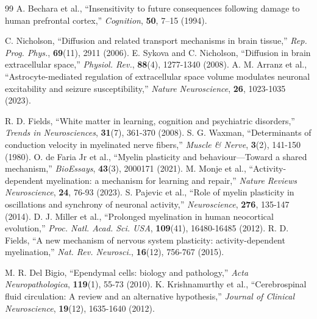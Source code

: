 \documentclass[12pt,a4paper]{article}
\begin{document}
\begin{thebibliography}{99}
			 A. Bechara et al., ``Insensitivity to future consequences following damage to human prefrontal cortex,'' \emph{Cognition}, \textbf{50}, 7--15 (1994).
			
			 C. Nicholson, ``Diffusion and related transport mechanisms in brain tissue,'' \emph{Rep. Prog. Phys.}, \textbf{69}(11), 2911 (2006).
			 E. Sykova and C. Nicholson, ``Diffusion in brain extracellular space,'' \emph{Physiol. Rev.}, \textbf{88}(4), 1277-1340 (2008).
			 A. M. Arranz et al., ``Astrocyte-mediated regulation of extracellular space volume modulates neuronal excitability and seizure susceptibility,'' \emph{Nature Neuroscience}, \textbf{26}, 1023-1035 (2023).
			
			 R. D. Fields, ``White matter in learning, cognition and psychiatric disorders,'' \emph{Trends in Neurosciences}, \textbf{31}(7), 361-370 (2008).
			 S. G. Waxman, ``Determinants of conduction velocity in myelinated nerve fibers,'' \emph{Muscle \& Nerve}, \textbf{3}(2), 141-150 (1980).
			 O. de Faria Jr et al., ``Myelin plasticity and behaviour—Toward a shared mechanism,'' \emph{BioEssays}, \textbf{43}(3), 2000171 (2021).
			 M. Monje et al., ``Activity-dependent myelination: a mechanism for learning and repair,'' \emph{Nature Reviews Neuroscience}, \textbf{24}, 76-93 (2023).
			 S. Pajevic et al., ``Role of myelin plasticity in oscillations and synchrony of neuronal activity,'' \emph{Neuroscience}, \textbf{276}, 135-147 (2014).
			 D. J. Miller et al., ``Prolonged myelination in human neocortical evolution,'' \emph{Proc. Natl. Acad. Sci. USA}, \textbf{109}(41), 16480-16485 (2012).
			 R. D. Fields, ``A new mechanism of nervous system plasticity: activity-dependent myelination,'' \emph{Nat. Rev. Neurosci.}, \textbf{16}(12), 756-767 (2015).
			
			 M. R. Del Bigio, ``Ependymal cells: biology and pathology,'' \emph{Acta Neuropathologica}, \textbf{119}(1), 55-73 (2010).
			 K. Krishnamurthy et al., ``Cerebrospinal fluid circulation: A review and an alternative hypothesis,'' \emph{Journal of Clinical Neuroscience}, \textbf{19}(12), 1635-1640 (2012).
			

\end{thebibliography}
\end{document}
